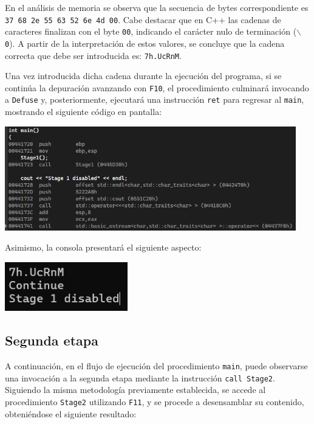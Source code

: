 \documentclass[11pt,a4paper]{article}
\begin{document}
\noindent En el análisis de memoria se observa que la secuencia de bytes correspondiente es \texttt{37 68 2e 55 63 52 6e 4d 00}. Cabe destacar que en C++ las cadenas de caracteres finalizan con el byte \texttt{00}, indicando el carácter nulo de terminación (\texttt{$\backslash$0}). A partir de la interpretación de estos valores, se concluye que la cadena correcta que debe ser introducida es: \texttt{7h.UcRnM}.\vspace{3ex}

\noindent Una vez introducida dicha cadena durante la ejecución del programa, si se continúa la depuración avanzando con \texttt{F10}, el procedimiento culminará invocando a \texttt{Defuse} y, posteriormente, ejecutará una instrucción \texttt{ret} para regresar al \texttt{main}, mostrando el siguiente código en pantalla:

\begin{center}
\includegraphics[width=0.95\textwidth]{s1-3.png}
\end{center}

\noindent Asimismo, la consola presentará el siguiente aspecto:
\begin{center}
\includegraphics[width=0.4\textwidth]{s1-4.png}
\end{center}
\vspace{3ex}

\subsection{Segunda etapa}

A continuación, en el flujo de ejecución del procedimiento \texttt{main}, puede observarse una invocación a la segunda etapa mediante la instrucción \texttt{call Stage2}. Siguiendo la misma metodología previamente establecida, se accede al procedimiento \texttt{Stage2} utilizando \texttt{F11}, y se procede a desensamblar su contenido, obteniéndose el siguiente resultado:
\end{document}
